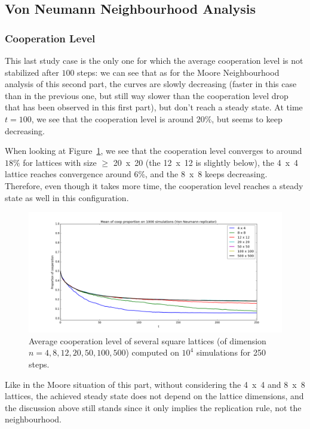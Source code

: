 \documentclass{article}
\begin{document}
\subsection{Von Neumann Neighbourhood Analysis}

\subsubsection{Cooperation Level}

This last study case is the only one for which the average cooperation level is not stabilized after $100$ steps:
we can see that as for the Moore Neighbourhood analysis of this second part, the curves are slowly decreasing
(faster in this case than in the previous one, but still way slower than the cooperation level drop that has
been observed in this first part), but don't reach a steady state. At time $t=100$, we see that the cooperation
level is around $20\%$, but seems to keep decreasing.

When looking at Figure~\ref{fig:replot of fig 1}, we see that the cooperation level converges to around $18\%$
for lattices with size $\geq$ 20~x~20 (the 12~x~12 is slightly below), the 4~x~4 lattice reaches convergence
around $6\%$, and the 8~x~8 keeps decreasing. Therefore, even though it takes more time, the cooperation level
reaches a steady state as well in this configuration.

\begin{figure}[!t]
\hspace{-1.8cm}
\includegraphics[width=1.2\textwidth]{imgs/fig_1_part_2_VN_0_to_250.png}
\caption{Average cooperation level of several square lattices (of dimension $n=4,8,12,20,50,100,500$) computed
on $10^4$ simulations for 250 steps.\label{fig:replot of fig 1}}
\end{figure}

Like in the Moore situation of this part, without considering the 4~x~4 and 8~x~8 lattices, the achieved
steady state does not depend on the lattice dimensions, and the discussion above still stands since it only
implies the replication rule, not the neighbourhood.
\end{document}
